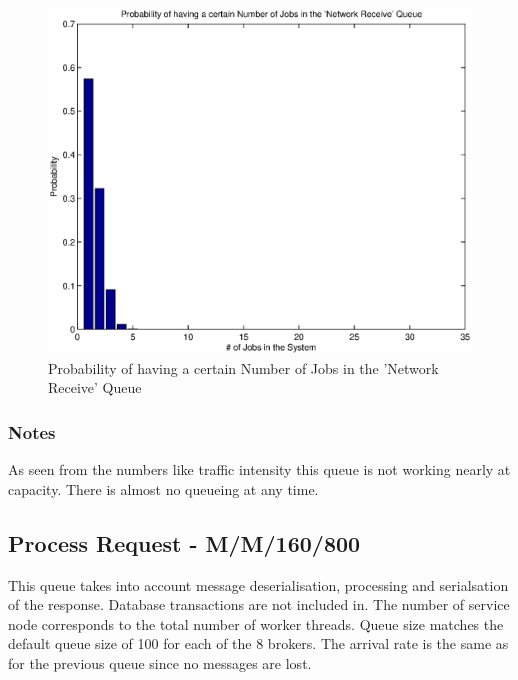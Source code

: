 \documentclass[a4paper]{article}
\begin{document}
\npnoround



\begin{figure}[H]
	\begin{center}
    \includegraphics[scale=0.6]{../plots-ms2-mg/queueanalysis-1NwReceive.eps}
  \end{center}
  \caption{Probability of having a certain Number of Jobs in the 'Network Receive' Queue}
  \label{fig:queueanalysis1}
\end{figure}


\subsubsection{Notes}

As seen from the numbers like traffic  intensity this queue is not working nearly at capacity. There is almost no queueing at any time.

\subsection{Process Request - M/M/160/800}
This queue takes into account message deserialisation, processing and serialsation of the response. Database transactions are not included in. The number of service node corresponds to the total number of worker threads. Queue size matches the default queue size of 100 for each of the 8 brokers. The arrival rate is the same as for the previous queue since no messages are lost.\\
\end{document}
